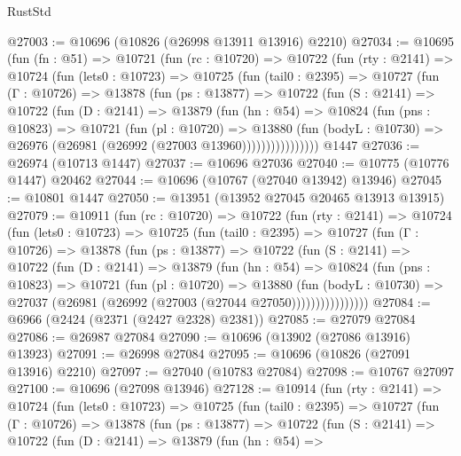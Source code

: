 \begin{lexlean}{RustStd}
\begin{coremodule}
@27003 := @10696 (@10826 (@26998 @13911 @13916) @2210)
@27034 := @10695
    (fun (fn : @51) =>
    @10721
      (fun (rc : @10720) =>
      @10722
        (fun (rty : @2141) =>
        @10724
          (fun (lets0 : @10723) =>
          @10725
            (fun (tail0 : @2395) =>
            @10727
              (fun (Γ : @10726) =>
              @13878
                (fun (ps : @13877) =>
                @10722
                  (fun (S : @2141) =>
                  @10722
                    (fun (D : @2141) =>
                    @13879
                      (fun (hn : @54) =>
                      @10824
                        (fun (pns : @10823) =>
                        @10721
                          (fun (pl : @10720) =>
                          @13880
                            (fun (bodyL : @10730) =>
                            @26976 (@26981 (@26992 (@27003 @13960))))))))))))))))
    @1447
@27036 := @26974 (@10713 @1447)
@27037 := @10696 @27036
@27040 := @10775 (@10776 @1447) @20462
@27044 := @10696 (@10767 (@27040 @13942) @13946)
@27045 := @10801 @1447
@27050 := @13951 (@13952 @27045 @20465 @13913 @13915)
@27079 := @10911
    (fun (rc : @10720) =>
    @10722
      (fun (rty : @2141) =>
      @10724
        (fun (lets0 : @10723) =>
        @10725
          (fun (tail0 : @2395) =>
          @10727
            (fun (Γ : @10726) =>
            @13878
              (fun (ps : @13877) =>
              @10722
                (fun (S : @2141) =>
                @10722
                  (fun (D : @2141) =>
                  @13879
                    (fun (hn : @54) =>
                    @10824
                      (fun (pns : @10823) =>
                      @10721
                        (fun (pl : @10720) =>
                        @13880
                          (fun (bodyL : @10730) =>
                          @27037 (@26981 (@26992 (@27003 (@27044 @27050))))))))))))))))
@27084 := @6966 (@2424 (@2371 (@2427 @2328) @2381))
@27085 := @27079 @27084
@27086 := @26987 @27084
@27090 := @10696 (@13902 (@27086 @13916) @13923)
@27091 := @26998 @27084
@27095 := @10696 (@10826 (@27091 @13916) @2210)
@27097 := @27040 (@10783 @27084)
@27098 := @10767 @27097
@27100 := @10696 (@27098 @13946)
@27128 := @10914
    (fun (rty : @2141) =>
    @10724
      (fun (lets0 : @10723) =>
      @10725
        (fun (tail0 : @2395) =>
        @10727
          (fun (Γ : @10726) =>
          @13878
            (fun (ps : @13877) =>
            @10722
              (fun (S : @2141) =>
              @10722
                (fun (D : @2141) =>
                @13879
                  (fun (hn : @54) =>

\end{coremodule}
\end{lexlean}
